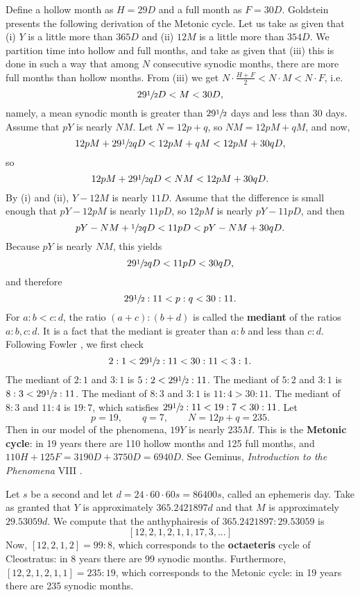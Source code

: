 \documentclass{article}
\begin{document}
Define a hollow month as $H=29D$ and a full month  as $F=30D$. 
Goldstein \cite{goldstein} presents the following derivation of  the Metonic cycle.
Let us take as given that
(i) $Y$ is a little more than $365 D$ and  (ii) $12 M$ is a little more than $354 D$. We partition time into
hollow and full months, and take as given that (iii) this is done in such a way that among $N$ consecutive synodic months, there are more
full months than hollow months.
From (iii) we get $N \cdot \frac{H+F}{2} < N\cdot M < N \cdot F$, i.e.
\[
29 \sfrac{1}{2}  D< M < 30D,
\]
namely, a mean synodic month is greater than $29\sfrac{1}{2}$ days and less than 30 days. 
Assume that $pY$ is nearly $NM$.
Let $N=12 p + q$, so
$N  M = 12pM + qM$, and
now,
\[
12pM+29 \sfrac{1}{2} qD <12pM+ qM < 12pM+30qD,
\]
so 
\[
12pM+29 \sfrac{1}{2} qD  < NM < 12pM +30qD.
\]
By (i) and (ii), $Y-12M$ is nearly $11D$. Assume that the difference is small enough that
$pY-12pM$ is nearly $11pD$, so $12pM$ is nearly $pY-11pD$, and then 
\[
pY -NM+  \sfrac{1}{2} qD < 11pD <  pY -NM+ 30qD.
\]
Because $pY$ is nearly $NM$, this yields
\[
29 \sfrac{1}{2} qD < 11pD < 30qD,
\]
and therefore
\[
29 \sfrac{1}{2} : 11 < p:q < 30:11.
\]
For $a:b < c:d$, the ratio $(a+c):(b+d)$ is called the \textbf{mediant} of the ratios $a:b, c:d$. 
It is a fact that the mediant is greater than $a:b$ and less than $c:d$. 
Following Fowler \cite[pp.~42--43]{fowler},
we first check
\[
2:1< 29 \sfrac{1}{2} : 11  < 30:11 < 3:1.
\]
The mediant of $2:1$ and $3:1$ is $5:2<29 \sfrac{1}{2} : 11$. 
The mediant of $5:2$ and $3:1$ is $8:3<29 \sfrac{1}{2} : 11$. 
The mediant of $8:3$ and $3:1$ is $11:4>30:11$. 
The mediant of $8:3$ and $11:4$ is $19:7$, which satisfies $29 \sfrac{1}{2}:11 < 19:7 < 30:11$. 
Let
\[
p=19,\qquad q=7,\qquad N = 12p+q = 235.
\]
Then in our model of the phenomena, $19Y$ is nearly $235M$. 
This is the \textbf{Metonic cycle}: in 19 years there are 110 hollow months and 125 full months,
and $110H+125F = 3190D + 3750D = 6940D$.
See Geminus, {\em Introduction to the Phenomena} VIII \cite{geminus}.


Let $s$ be a second and
let $d=24 \cdot 60 \cdot 60 s =  86400s$, called an ephemeris day. 
Take as granted that $Y$ is approximately $365.2421897d$ and that $M$ is approximately
$29.53059d$. We compute that the anthyphairesis of $365.2421897:29.53059$ is
\[
[12,2,1,2,1,1,17,3,\ldots]
\]
Now, $[12,2,1,2] =99:8$,
which corresponds to the \textbf{octaeteris} cycle of Cleostratus: in $8$ years there are 99 synodic months.
Furthermore, $[12,2,1,2,1,1] = 235:19$, which corresponds to the Metonic cycle: in 19 years there
are 235 synodic months.  
\end{document}
